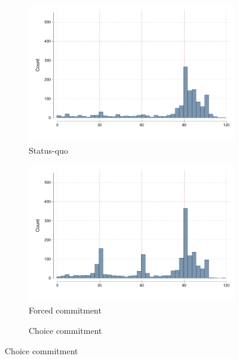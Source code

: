 \vspace{.2in}
\begin{figure}[H]
    \caption{Histogram of payments}
    \label{hist_payments}
    \begin{center}
    \begin{subfigure}{0.45\textwidth}
        \caption{Status-quo}
        \centering
        \includegraphics[width=\textwidth]{Figuras/hist_payments_sq.pdf}
    \end{subfigure}
    \begin{subfigure}{0.45\textwidth}
        \caption{Forced commitment}
        \centering
        \includegraphics[width=\textwidth]{Figuras/hist_payments_fc.pdf}
    \end{subfigure}
    \begin{subfigure}{0.45\textwidth}
        \caption{Choice commitment}
        \centering

\end{subfigure}
\end{center}
\end{figure}
